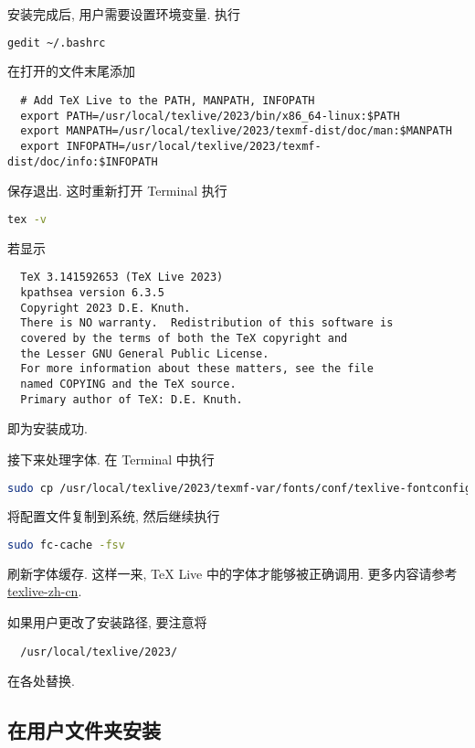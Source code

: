 安装完成后,
用户需要设置环境变量.
执行
\begin{lstlisting}[language = bash]
  gedit ~/.bashrc
\end{lstlisting}
在打开的文件末尾添加
\begin{lstlisting}
  # Add TeX Live to the PATH, MANPATH, INFOPATH
  export PATH=/usr/local/texlive/2023/bin/x86_64-linux:$PATH
  export MANPATH=/usr/local/texlive/2023/texmf-dist/doc/man:$MANPATH
  export INFOPATH=/usr/local/texlive/2023/texmf-dist/doc/info:$INFOPATH
\end{lstlisting}
保存退出.
这时重新打开 \textsf{Terminal} 执行
\begin{lstlisting}[language=bash]
  tex -v
\end{lstlisting}
若显示
\begin{lstlisting}
  TeX 3.141592653 (TeX Live 2023)
  kpathsea version 6.3.5
  Copyright 2023 D.E. Knuth.
  There is NO warranty.  Redistribution of this software is
  covered by the terms of both the TeX copyright and
  the Lesser GNU General Public License.
  For more information about these matters, see the file
  named COPYING and the TeX source.
  Primary author of TeX: D.E. Knuth.
\end{lstlisting}
即为安装成功.

接下来处理字体.
在 \textsf{Terminal} 中执行
\begin{lstlisting}[language=bash]
  sudo cp /usr/local/texlive/2023/texmf-var/fonts/conf/texlive-fontconfig.conf /etc/fonts/conf.d/09-texlive.conf
\end{lstlisting}
将配置文件复制到系统,
然后继续执行
\begin{lstlisting}[language=bash]
  sudo fc-cache -fsv
\end{lstlisting}
刷新字体缓存.
这样一来, \TeX{} Live 中的字体才能够被正确调用.
更多内容请参考 \href{https://www.tug.org/texlive/doc/texlive-zh-cn/texlive-zh-cn.pdf}{texlive-zh-cn}.

如果用户更改了安装路径,
要注意将
\begin{lstlisting}
  /usr/local/texlive/2023/
\end{lstlisting}
在各处替换.

\subsection{在用户文件夹安装}\label{subsec:ubuntu-user-folder}


